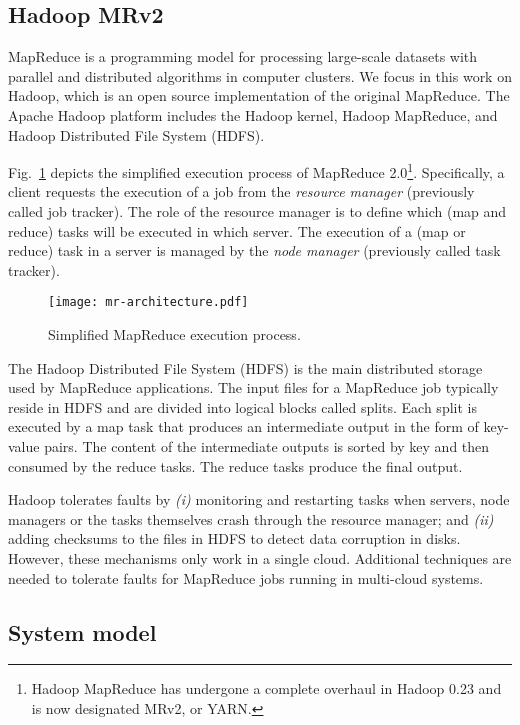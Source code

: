 \documentclass[10pt, conference, compsocconf]{IEEEtran}
\begin{document}
\subsection{Hadoop MRv2}
\label{sec:hadoop:mapreduce}

MapReduce is a programming model for processing large-scale datasets with parallel and distributed algorithms in computer clusters. We focus in this work on Hadoop, which is an open source implementation of the original MapReduce. The Apache Hadoop platform includes the Hadoop kernel, Hadoop MapReduce, and Hadoop Distributed File System (HDFS).

Fig.~\ref{fig:mr-architecture} depicts the simplified execution process of MapReduce 2.0\footnote{\small Hadoop MapReduce has undergone a complete overhaul in Hadoop 0.23  and is now designated MRv2, or YARN.}. Specifically, a client requests the execution of a job from the \emph{resource manager} (previously called job tracker).
The role of the resource manager is to define which (map and reduce) tasks will be executed in which server.
The execution of a (map or reduce) task in a server is managed by the \emph{node manager} (previously called task tracker).

\begin{figure}[!tb]
  \centering
  \texttt{[image: mr-architecture.pdf]}
  \caption{Simplified MapReduce execution process.}
  \vspace{1em}
  \label{fig:mr-architecture}
\end{figure}

The Hadoop Distributed File System (HDFS) is the main distributed storage used by MapReduce applications. The input files for a MapReduce job typically reside in HDFS and are divided into logical blocks called splits. Each split is executed by a map task that produces an intermediate output in the form of key-value pairs. The content of the intermediate outputs is sorted by key and then consumed by the reduce tasks. The reduce tasks produce the final output.

Hadoop tolerates faults by \textit{(i)} monitoring and restarting tasks when servers, node managers or the tasks themselves crash through the resource manager; and \textit{(ii)} adding checksums to the files in HDFS to detect data corruption in disks. However, these mechanisms only work in a single cloud. Additional techniques are needed to tolerate faults for MapReduce jobs running in multi-cloud systems.

\subsection{System model}
\label{sec:problem:statement:system:model}
\end{document}

